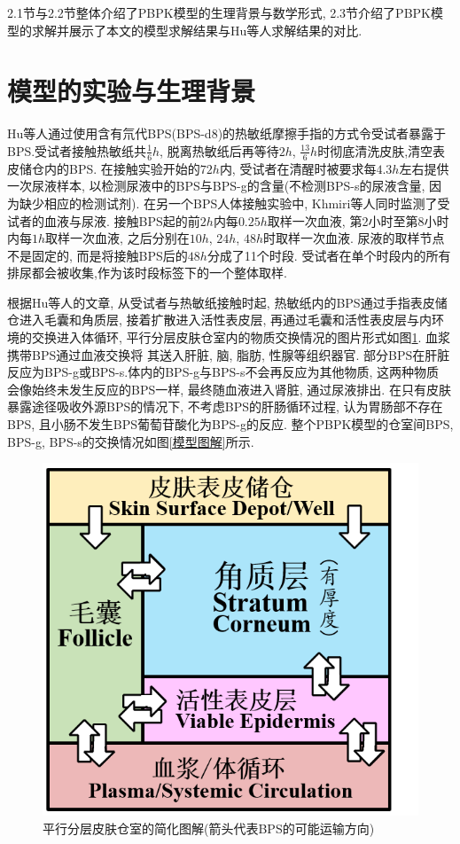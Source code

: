 \documentclass[a4paper,punct=banjiao,twoside]{ctexrep}
\theoremstyle{plain}
\theoremstyle{definition}
\theoremstyle{remark}
\begin{document}
2.1节与2.2节整体介绍了PBPK模型的生理背景与数学形式, 2.3节介绍了PBPK模型的求解并展示了本文的模型求解结果与Hu等人\cite{11}求解结果的对比.
\section{模型的实验与生理背景}
Hu等人\cite{11}通过使用含有氘代BPS(BPS-d8)的热敏纸摩擦手指的方式令受试者暴露于BPS.受试者接触热敏纸共$\frac{1}{6}h$, 脱离热敏纸后再等待$2h$, $\frac{13}{6}h$时彻底清洗皮肤,清空表皮储仓内的BPS.
在接触实验开始的$72h$内, 受试者在清醒时被要求每$4.3h$左右提供一次尿液样本, 以检测尿液中的BPS与BPS-g的含量(不检测BPS-s的尿液含量, 因为缺少相应的检测试剂).
在另一个BPS人体接触实验中, Khmiri等人\cite{13}同时监测了受试者的血液与尿液. 接触BPS起的前$2h$内每$0.25h$取样一次血液, 第2小时至第8小时内每$1h$取样一次血液, 之后分别在$10h$, $24h$, $48h$时取样一次血液.
尿液的取样节点不是固定的, 而是将接触BPS后的$48h$分成了11个时段. 受试者在单个时段内的所有排尿都会被收集,作为该时段标签下的一个整体取样. 

根据Hu等人的文章\cite{11}, 从受试者与热敏纸接触时起, 热敏纸内的BPS通过手指表皮储仓进入毛囊和角质层, 接着扩散进入活性表皮层, 再通过毛囊和活性表皮层与内环境的交换进入体循环, 平行分层皮肤仓室内的物质交换情况的图片形式如图\ref{分层皮肤}. 血浆携带BPS通过血液交换将
其送入肝脏, 脑, 脂肪, 性腺等组织器官. 部分BPS在肝脏反应为BPS-g或BPS-s.体内的BPS-g与BPS-s不会再反应为其他物质, 这两种物质
会像始终未发生反应的BPS一样, 最终随血液进入肾脏, 通过尿液排出. 在只有皮肤暴露途径吸收外源BPS的情况下, 不考虑BPS的肝肠循环过程, 认为胃肠部不存在BPS, 且小肠不发生BPS葡萄苷酸化为BPS-g的反应. 
整个PBPK模型的仓室间BPS, BPS-g, BPS-s的交换情况如图\ref{模型图解}所示.
\begin{figure}[H]
  \centering
  \includegraphics[scale=0.54]{./figs/p1.png}
  \caption{平行分层皮肤仓室的简化图解(箭头代表BPS的可能运输方向)}
  \label{分层皮肤}
\end{figure}
\end{document}
